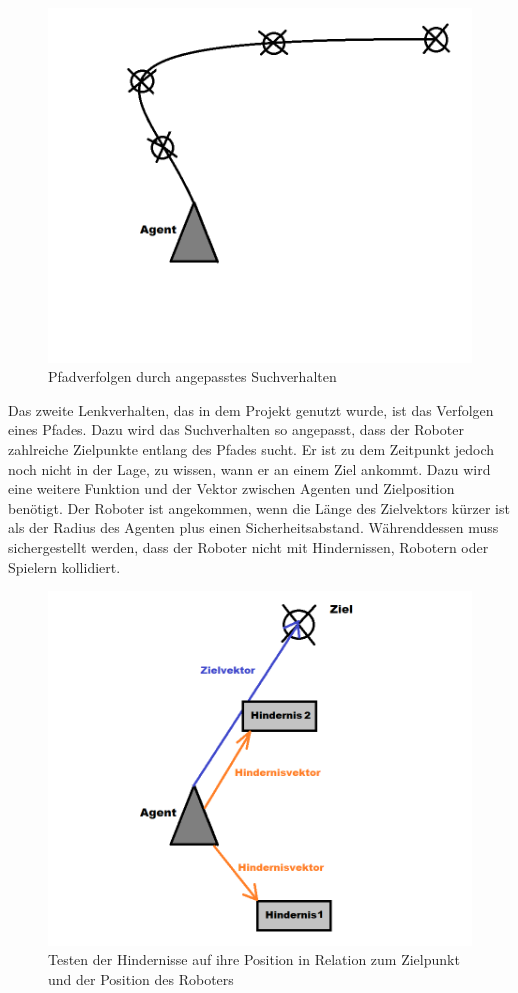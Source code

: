 \begin{figure}[h]
	\centering
	\includegraphics[height=0.3\pageheight,keepaspectratio]{pics/Pathfollowing} 
	\caption{Pfadverfolgen durch angepasstes Suchverhalten}
\end{figure}
Das zweite Lenkverhalten, das in dem Projekt genutzt wurde, ist das Verfolgen eines Pfades. Dazu wird das Suchverhalten so angepasst, dass der Roboter zahlreiche Zielpunkte entlang des Pfades sucht. Er ist zu dem Zeitpunkt jedoch noch nicht in der Lage, zu wissen, wann er an einem Ziel ankommt. Dazu wird eine weitere Funktion und der Vektor zwischen Agenten und Zielposition benötigt. Der Roboter ist angekommen, wenn die Länge des Zielvektors kürzer ist als der Radius des Agenten plus einen Sicherheitsabstand. Währenddessen muss sichergestellt werden, dass der Roboter nicht mit Hindernissen, Robotern oder Spielern kollidiert. 
\begin{figure}[h]
	\centering
	\includegraphics[height=0.3\pageheight,keepaspectratio]{pics/Avoidance1} 
	\caption{Testen der Hindernisse auf ihre Position in Relation zum Zielpunkt und der Position des Roboters}
\end{figure}
